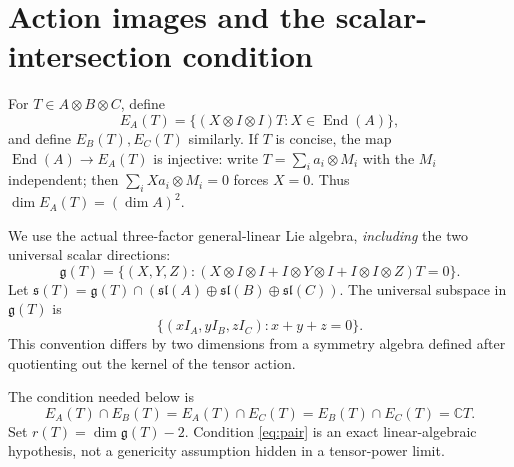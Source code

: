 \documentclass[11pt]{article}
\theoremstyle{remark}\newtheorem{remark}[theorem]{Remark}
\newcommand{\C}{\mathbb C}
\newcommand{\End}{\operatorname{End}}
\newcommand{\g}{\mathfrak g}
\newcommand{\s}{\mathfrak s}
\begin{document}
\section{Action images and the scalar-intersection condition}\label{sec:action}
For $T\in A\otimes B\otimes C$, define
\[
 E_A(T)=\{(X\otimes I\otimes I)T:X\in\End(A)\},
\]
and define $E_B(T),E_C(T)$ similarly. If $T$ is concise, the map $\End(A)\to E_A(T)$ is injective: write $T=\sum_i a_i\otimes M_i$ with the $M_i$ independent; then $\sum_i Xa_i\otimes M_i=0$ forces $X=0$. Thus $\dim E_A(T)=(\dim A)^2$.

We use the actual three-factor general-linear Lie algebra, \emph{including} the two universal scalar directions:
\[
 \g(T)=\{(X,Y,Z):(X\otimes I\otimes I+I\otimes Y\otimes I+I\otimes I\otimes Z)T=0\}.
\]
Let $\s(T)=\g(T)\cap(\mathfrak{sl}(A)\oplus\mathfrak{sl}(B)\oplus\mathfrak{sl}(C))$. The universal subspace in $\g(T)$ is
\begin{equation}\label{eq:scalar}
 \{(xI_A,yI_B,zI_C):x+y+z=0\}.
\end{equation}
This convention differs by two dimensions from a symmetry algebra defined after quotienting out the kernel of the tensor action.

The condition needed below is
\begin{equation}\label{eq:pair}
 E_A(T)\cap E_B(T)=E_A(T)\cap E_C(T)=E_B(T)\cap E_C(T)=\C T.
\end{equation}
Set $r(T)=\dim\g(T)-2$. Condition \eqref{eq:pair} is an exact linear-algebraic hypothesis, not a genericity assumption hidden in a tensor-power limit.
\end{document}
